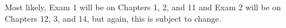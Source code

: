 \documentclass[margin]{res}
\theoremstyle{plain}
\theoremstyle{definition}
\theoremstyle{remark}
\begin{document}
\begin{resume}
Most likely, Exam 1 will be on Chapters 1, 2, and 11 and Exam 2 will be on Chapters 12, 3, and 14, but again, this is subject to change.


% 
% 

\end{resume}
\end{document}
